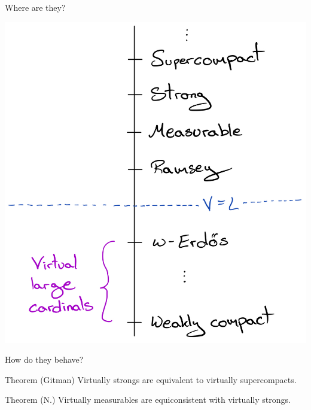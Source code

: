 \documentclass{beamer}
\begin{document}
\begin{frame}{Where are they?}
  \begin{center}
    \includegraphics[scale=.16]{gfx/hierarchy.jpg}
  \end{center}
\end{frame}

\begin{frame}{How do they behave?}
  \begin{block}{Theorem (Gitman)}
    Virtually strongs are equivalent to virtually supercompacts.
  \end{block}

  \pause

  \begin{block}{Theorem (N.)}
    Virtually measurables are equiconsistent with virtually strongs.
  \end{block}
\end{frame}
\end{document}
